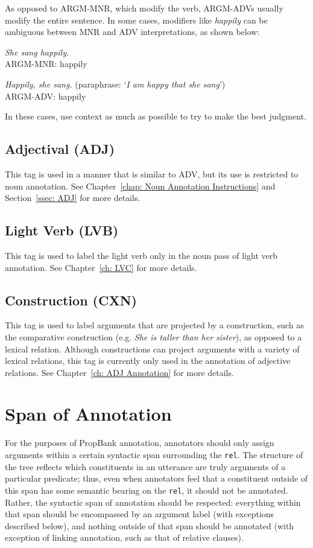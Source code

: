 \documentclass[11pt]{report}
\begin{document}
As opposed to ARGM-MNR, which modify the verb,  ARGM-ADVs usually modify the entire sentence. In some cases,  modifiers like \textit{happily} can be ambiguous between MNR and ADV interpretations, as shown below: 

\textit{She sang happily.}\\
ARGM-MNR:	happily

\textit{Happily, she sang.} (paraphrase: `\textit{I am happy that she sang}')\\
ARGM-ADV:	happily

In these cases, use context as much as possible to try to make the best judgment.  

\subsection{Adjectival (ADJ)}
This tag is used in a manner that is similar to ADV, but its use is restricted to noun annotation.  See Chapter~\ref{chap: Noun Annotation Instructions} and Section~\ref{ssec: ADJ} for more details.  

\subsection{Light Verb (LVB)}
\label{ssec: LVB}

This tag is used to label the light verb only in the noun pass of light verb annotation.  See Chapter~\ref{ch: LVC} for more details.  

\subsection{Construction (CXN)}
\label{ssec: CXN}

This tag is used to label arguments that are projected by a construction, such as the comparative construction (e.g. \textit{She is taller than her sister}), as opposed to a lexical relation.  Although constructions can project arguments with a variety of lexical relations, this tag is currently only used in the annotation of adjective relations.  See Chapter~\ref{ch: ADJ Annotation} for more details. 

\section{Span of Annotation}
\label{sec: span}
For the purposes of PropBank annotation, annotators should only assign arguments within a certain syntactic span surrounding the \texttt{rel}.  The structure of the tree reflects which constituents in an utterance are truly arguments of a particular predicate; thus, even when annotators feel that a constituent outside of this span has some semantic bearing on the \texttt{rel}, it should not be annotated.  Rather, the syntactic span of annotation should be respected: everything within that span should be encompassed by an argument label (with exceptions described below), and nothing outside of that span should be annotated (with exception of linking annotation, such as that of relative clauses). 
\end{document}
